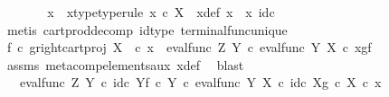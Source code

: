 \begin{isabellebody}
\ \ \ \ \isamarkupfalse%
\ \isamarkupfalse%
\ x\ \ x{\isacharunderscore}{\kern0pt}type{\isacharbrackleft}{\kern0pt}type{\isacharunderscore}{\kern0pt}rule{\isacharbrackright}{\kern0pt}{\isacharcolon}{\kern0pt}\ {\isachardoublequoteopen}x\ {\isasymin}\isactrlsub c\ X{\isachardoublequoteclose}\ \ x{\isacharunderscore}{\kern0pt}def{\isacharcolon}{\kern0pt}\ {\isachardoublequoteopen}x{}\ {\isacharequal}{\kern0pt}\ {\isasymlangle}x{\isacharcomma}{\kern0pt}\ id\isactrlsub c\ {\isasymone}{\isasymrangle}{\isachardoublequoteclose}\isanewline
\ \ \ \ \ \ \isamarkupfalse%
\ {\isacharparenleft}{\kern0pt}metis\ cart{\isacharunderscore}{\kern0pt}prod{\isacharunderscore}{\kern0pt}decomp\ id{\isacharunderscore}{\kern0pt}type\ terminal{\isacharunderscore}{\kern0pt}func{\isacharunderscore}{\kern0pt}unique{\isacharparenright}{\kern0pt}\isanewline
\ \ \ \ \isamarkupfalse%
\ \isamarkupfalse%
\ {\isachardoublequoteopen}{\isacharparenleft}{\kern0pt}f\isactrlsup {\isasymflat}\ {\isasymcirc}\isactrlsub c\ {\isasymlangle}g\isactrlsup {\isasymflat}{\isacharcomma}{\kern0pt}right{\isacharunderscore}{\kern0pt}cart{\isacharunderscore}{\kern0pt}proj\ X\ {\isasymone}{\isasymrangle}{\isacharparenright}{\kern0pt}\ {\isasymcirc}\isactrlsub c\ x{}\ {\isacharequal}{\kern0pt}\ eval{\isacharunderscore}{\kern0pt}func\ Z\ Y\ {\isasymcirc}\isactrlsub c\ {\isasymlangle}eval{\isacharunderscore}{\kern0pt}func\ Y\ X\ {\isasymcirc}\isactrlsub c\ {\isasymlangle}x{\isacharcomma}{\kern0pt}g{\isasymrangle}{\isacharcomma}{\kern0pt}f{\isasymrangle}{\isachardoublequoteclose}\isanewline
\ \ \ \ \ \ \isamarkupfalse%
\ assms\ meta{\isacharunderscore}{\kern0pt}comp{}{\isacharunderscore}{\kern0pt}elements{\isacharunderscore}{\kern0pt}aux\ x{\isacharunderscore}{\kern0pt}def\ \isamarkupfalse%
\ blast\isanewline
\ \ \ \ \isamarkupfalse%
\ \isamarkupfalse%
\ {\isachardoublequoteopen}{\isachardot}{\kern0pt}{\isachardot}{\kern0pt}{\isachardot}{\kern0pt}\ {\isacharequal}{\kern0pt}\ eval{\isacharunderscore}{\kern0pt}func\ Z\ Y\ {\isasymcirc}\isactrlsub c\ {\isasymlangle}id\isactrlsub c\ Y{\isacharcomma}{\kern0pt}f\ {\isasymcirc}\isactrlsub c\ {\isasymbeta}\isactrlbsub Y\isactrlesub {\isasymrangle}\ {\isasymcirc}\isactrlsub c\ eval{\isacharunderscore}{\kern0pt}func\ Y\ X\ {\isasymcirc}\isactrlsub c\ {\isasymlangle}id\isactrlsub c\ X{\isacharcomma}{\kern0pt}g\ {\isasymcirc}\isactrlsub c\ {\isasymbeta}\isactrlbsub X\isactrlesub {\isasymrangle}\ {\isasymcirc}\isactrlsub c\ x{\isachardoublequoteclose}\isanewline

\end{isabellebody}
